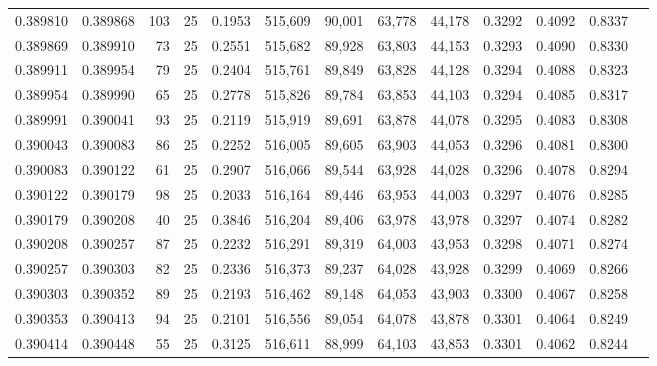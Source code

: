 \begin{tabular}{rrrrrrrrrrrrr}
0.389810 & 0.389868 &   103 &  25 &                                     0.1953 & 515,609 &  90,001 &  63,778 &  44,178 & 0.3292 & 0.4092 & 0.8337 \\
0.389869 & 0.389910 &    73 &  25 &                                     0.2551 & 515,682 &  89,928 &  63,803 &  44,153 & 0.3293 & 0.4090 & 0.8330 \\
0.389911 & 0.389954 &    79 &  25 &                                     0.2404 & 515,761 &  89,849 &  63,828 &  44,128 & 0.3294 & 0.4088 & 0.8323 \\
0.389954 & 0.389990 &    65 &  25 &                                     0.2778 & 515,826 &  89,784 &  63,853 &  44,103 & 0.3294 & 0.4085 & 0.8317 \\
0.389991 & 0.390041 &    93 &  25 &                                     0.2119 & 515,919 &  89,691 &  63,878 &  44,078 & 0.3295 & 0.4083 & 0.8308 \\
0.390043 & 0.390083 &    86 &  25 &                                     0.2252 & 516,005 &  89,605 &  63,903 &  44,053 & 0.3296 & 0.4081 & 0.8300 \\
0.390083 & 0.390122 &    61 &  25 &                                     0.2907 & 516,066 &  89,544 &  63,928 &  44,028 & 0.3296 & 0.4078 & 0.8294 \\
0.390122 & 0.390179 &    98 &  25 &                                     0.2033 & 516,164 &  89,446 &  63,953 &  44,003 & 0.3297 & 0.4076 & 0.8285 \\
0.390179 & 0.390208 &    40 &  25 &                                     0.3846 & 516,204 &  89,406 &  63,978 &  43,978 & 0.3297 & 0.4074 & 0.8282 \\
0.390208 & 0.390257 &    87 &  25 &                                     0.2232 & 516,291 &  89,319 &  64,003 &  43,953 & 0.3298 & 0.4071 & 0.8274 \\
0.390257 & 0.390303 &    82 &  25 &                                     0.2336 & 516,373 &  89,237 &  64,028 &  43,928 & 0.3299 & 0.4069 & 0.8266 \\
0.390303 & 0.390352 &    89 &  25 &                                     0.2193 & 516,462 &  89,148 &  64,053 &  43,903 & 0.3300 & 0.4067 & 0.8258 \\
0.390353 & 0.390413 &    94 &  25 &                                     0.2101 & 516,556 &  89,054 &  64,078 &  43,878 & 0.3301 & 0.4064 & 0.8249 \\
0.390414 & 0.390448 &    55 &  25 &                                     0.3125 & 516,611 &  88,999 &  64,103 &  43,853 & 0.3301 & 0.4062 & 0.8244 \\

\end{tabular}

